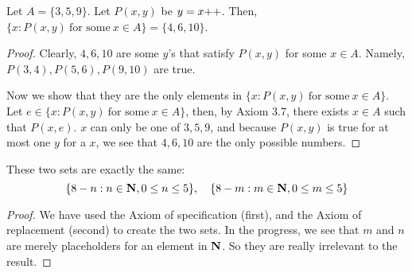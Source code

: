 \begin{why}{35}
	Let $A = \{3,5,9\}$. Let $P(x,y)$ be $y = x{+}{+}$. Then, $\{x:P(x,y)\ \text{for some}\ x \in A\} = \{4,6,10\}$.
\end{why}
\begin{proof}
	Clearly, $4,6,10$ are some $y$'s that satisfy $P(x,y)$ for some $x \in A$. Namely, $P(3,4), P(5,6), P(9,10)$ are true.
	
	Now we show that they are the only elements in $\{x:P(x,y)\ \text{for some}\ x \in A\}$. Let $e \in \{x:P(x,y)\ \text{for some}\ x \in A\}$, then, by Axiom 3.7, there exists $x \in A$ such that $P(x,e)$. $x$ can only be one of $3,5,9$, and because $P(x,y)$ is true for at most one $y$ for a $x$, we see that $4,6,10$ are the only possible numbers.
\end{proof}

\begin{why}{36}
	These two sets are exactly the same:
	\[
	\{8-n: n \in \mathbf{N}, 0 \le n \le 5\}, \quad \{8-m: m \in \mathbf{N}, 0 \le m \le 5\}
	\]
\end{why}
\begin{proof}
	We have used the Axiom of specification (first), and the Axiom of replacement (second) to create the two sets. In the progress, we see that $m$ and $n$ are merely placeholders for an element in $\mathbf{N}$. So they are really irrelevant to the result.
\end{proof}


